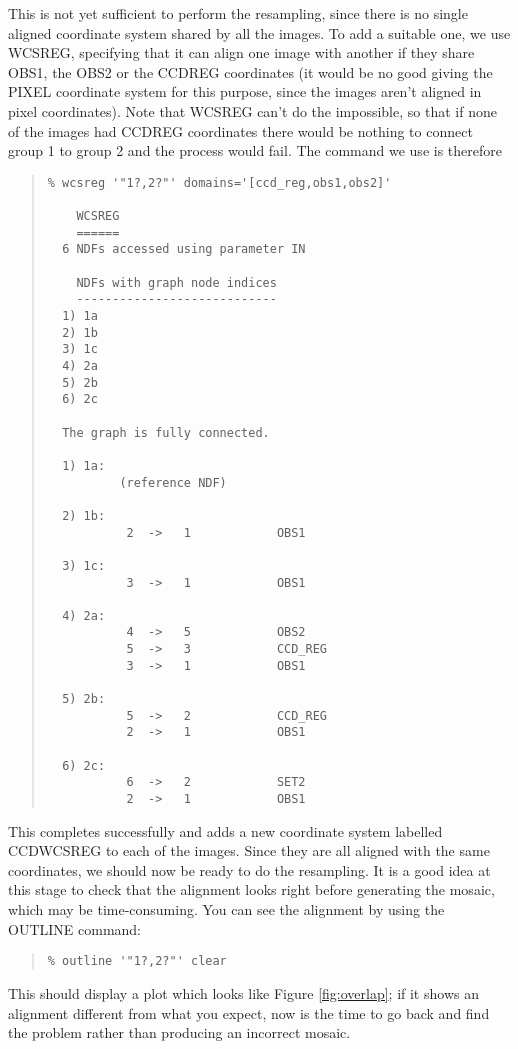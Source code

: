 \documentclass[twoside,11pt]{article}
\newcommand{\hyperref}[4]{#2\ref{#4}#3}
\newcommand{\htmlref}[2]{#1}
\renewcommand{\_}{\texttt{\symbol{95}}}
\newenvironment{myquote}{\begin{quote}\begin{small}}{\end{small}\end{quote}}
\newcommand{\routine}[1]{{\sc #1}}
\newcommand{\xroutine}[1]{\htmlref{{\sc #1}}{#1}}
\begin{document}
This is not yet sufficient to perform the resampling,
since there is no single aligned coordinate system shared by all the images.
To add a suitable one, we use \xroutine{WCSREG},
specifying that it can align one image with another if they share
OBS1, the OBS2 or the CCD\_REG coordinates (it would be no good
giving the PIXEL coordinate system for this purpose, since the images aren't
aligned in pixel coordinates).
Note that \routine{WCSREG} can't do the impossible, so that if
none of the images had CCD\_REG coordinates there would be nothing
to connect group 1 to group 2 and the process would fail.
The command we use is therefore
\begin{myquote}
\begin{verbatim}
% wcsreg '"1?,2?"' domains='[ccd_reg,obs1,obs2]'

    WCSREG
    ======
  6 NDFs accessed using parameter IN

    NDFs with graph node indices
    ----------------------------
  1) 1a
  2) 1b
  3) 1c
  4) 2a
  5) 2b
  6) 2c

  The graph is fully connected.

  1) 1a:
          (reference NDF)

  2) 1b:
           2  ->   1            OBS1

  3) 1c:
           3  ->   1            OBS1

  4) 2a:
           4  ->   5            OBS2
           5  ->   3            CCD_REG
           3  ->   1            OBS1

  5) 2b:
           5  ->   2            CCD_REG
           2  ->   1            OBS1

  6) 2c:
           6  ->   2            SET2
           2  ->   1            OBS1
\end{verbatim}
\end{myquote}
This completes successfully and adds a new coordinate system
labelled CCD\_WCSREG to each of the images.
Since they are all aligned with the same coordinates, we should now be
ready to do the resampling.
It is a good idea at this stage to check that the alignment looks right
before generating the mosaic, which may be time-consuming.
You can see the alignment by using the \xroutine{OUTLINE}
command:
\begin{myquote}
\begin{verbatim}
% outline '"1?,2?"' clear
\end{verbatim}
\end{myquote}
This should display a plot which looks like 
\hyperref{the above figure}{Figure }{}{fig:overlap};
if it shows an alignment different from what you expect, 
now is the time to go back
and find the problem rather than producing an incorrect mosaic.
\end{document}
